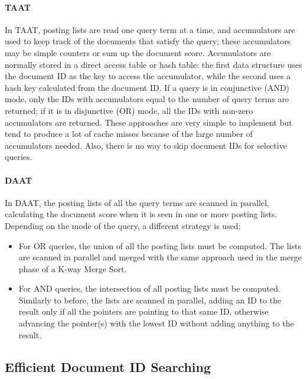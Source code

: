 \paragraph{TAAT}
In TAAT, posting lists are read one query term at a time, and accumulators are used to keep track of the documents that satisfy the query; these accumulators may be simple counters or sum up the document score. Accumulators are normally stored in a direct access table or hash table: the first data structure uses the document ID as the key to access the accumulator, while the second uses a hash key calculated from the document ID. If a query is in conjunctive (AND) mode, only the IDs with accumulators equal to the number of query terms are returned; if it is in disjunctive (OR) mode, all the IDs with non-zero accumulators are returned. These approaches are very simple to implement but tend to produce a lot of cache misses because of the large number of accumulators needed. Also, there is no way to skip document IDs for selective queries.

\paragraph{DAAT}
In DAAT, the posting lists of all the query terms are scanned in parallel, calculating the document score when it is seen in one or more posting lists. Depending on the mode of the query, a different strategy is used:
\begin{itemize}
    \item For OR queries, the union of all the posting lists must be computed. The lists are scanned in parallel and merged with the same approach used in the merge phase of a K-way Merge Sort.
    \item For AND queries, the intersection of all posting lists must be computed. Similarly to before, the lists are scanned in parallel, adding an ID to the result only if all the pointers are pointing to that same ID, otherwise advancing the pointer(s) with the lowest ID without adding anything to the result.
\end{itemize}

\subsection{Efficient Document ID Searching}


